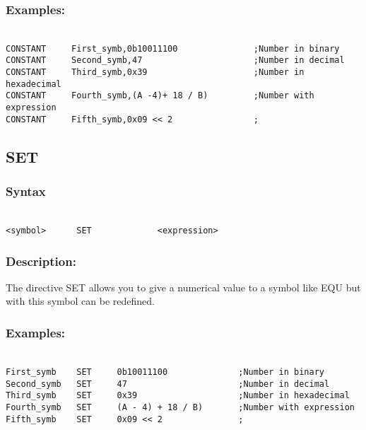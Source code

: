        \subsubsection{Examples:}
        {
            ~\\
            \usecodefont
            \verb'CONSTANT     First_symb,0b10011100               ;Number in binary'\\
            \verb'CONSTANT     Second_symb,47                      ;Number in decimal'\\
            \verb'CONSTANT     Third_symb,0x39                     ;Number in hexadecimal'\\
            \verb'CONSTANT     Fourth_symb,(A -4)+ 18 / B)         ;Number with expression'\\
            \verb'CONSTANT     Fifth_symb,0x09 << 2                ;'\\
        }

    \subsection{SET}
        \subsubsection{Syntax}
        {
            ~\\
            \usecodefont
            \verb'<symbol>      SET             <expression>'
        }
        \subsubsection{Description:}
            The directive SET allows you to give a numerical value to a symbol like EQU but with this symbol can be redefined.

        \subsubsection{Examples:}
        {
            ~\\
            \usecodefont
            \verb'First_symb    SET     0b10011100              ;Number in binary'\\
            \verb'Second_symb   SET     47                      ;Number in decimal'\\
            \verb'Third_symb    SET     0x39                    ;Number in hexadecimal'\\
            \verb'Fourth_symb   SET     (A - 4) + 18 / B)       ;Number with expression'\\
            \verb'Fifth_symb    SET     0x09 << 2               ;'\\
        }


